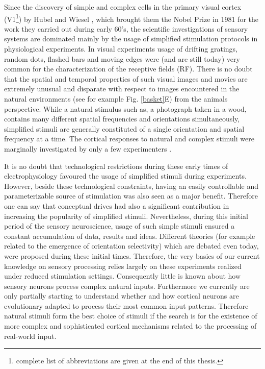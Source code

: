 Since the discovery of simple and complex cells in the primary visual
cortex (V1\footnote{complete list of abbreviations are given at the end of
this thesis.})  by Hubel and Wiesel
\citep{hubel1959a,hubel1962a}, which brought them the Nobel Prize in 1981
for the work they carried out during early 60's, the scientific
investigations of sensory systems are dominated mainly by the usage of
simplified stimulation protocols in physiological experiments. In visual
experiments usage of drifting gratings, random dots, flashed bars and
moving edges were (and are still today) very common for the
characterization of the receptive fields (RF). There is no doubt that the spatial and temporal properties of such
visual images and movies are extremely unusual and disparate with respect
to images encountered in the natural environments (see for example Fig.
\ref{basket}E) from the animals perspective. While a natural stimulus such
as, a photograph taken in a wood, contains many different spatial
frequencies and orientations simultaneously, simplified stimuli are
generally constituted of a single orientation and spatial frequency at a
time. The cortical responses to natural and complex stimuli were marginally
investigated by only a few experimenters \citep{creutzfeldt1978a}. 


It is no doubt that technological restrictions during these early times of
electrophysiology favoured the usage of simplified stimuli during
experiments. However, beside these technological constraints, having an
easily controllable and parameterizable source of stimulation was also seen
as a major benefit. Therefore one can say that conceptual drives had also a
significant contribution in increasing the popularity of simplified
stimuli.  Nevertheless, during this initial period of the sensory
neuroscience, usage of such simple stimuli ensured a constant accumulation
of data, results and ideas.  Different theories (for example related to the
emergence of orientation selectivity) which are debated even today, were
proposed during these initial times.  Therefore, the very basics of our
current knowledge on sensory processing relies largely on these experiments
realized under reduced stimulation settings. Consequently little is known
about how sensory neurons process complex natural inputs. Furthermore we
currently are only partially starting to understand whether and how
cortical neurons are evolutionary adapted to process their most common
input patterns. Therefore natural stimuli form the best choice of stimuli
if the search is for the existence of more complex and sophisticated
cortical mechanisms related to the processing of real-world input. 


